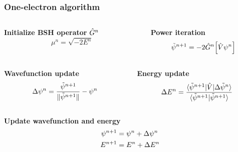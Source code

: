 \begin{frame}
  \frametitle{One-electron algorithm}
  \begin{columns}
    \begin{column}{.50\textwidth}
      \centering
      \textbf{Initialize BSH operator} $\hat{G}^n$
      \begin{equation}
        \nonumber
        \mu^n = \sqrt{-2E^n}
      \end{equation}
    \end{column}

    \begin{column}{.50\textwidth}
      \centering
      \textbf{Power iteration}
      \begin{equation}
        \nonumber
        \tilde{\psi}^{n+1} = -2\hat{G}^n \Big[\hat{V} \psi^n \Big]
      \end{equation}
    \end{column}
  \end{columns}

  \vspace{5mm}

  \begin{columns}
    \begin{column}{.50\textwidth}
      \centering
      \textbf{Wavefunction update}
      \begin{equation}
        \nonumber
        \Delta\psi^n =
        \frac{\tilde{\psi}^{n+1}}{\|\tilde{\psi}^{n+1}\|} - \psi^n
      \end{equation}
    \end{column}

    \begin{column}{.50\textwidth}
      \centering
      \textbf{Energy update}
      \begin{equation}
        \nonumber
        \Delta E^n =
        \frac{\langle\tilde{\psi}^{n+1}|\hat{V}|\Delta\tilde{\psi}^n\rangle}
        {\langle\tilde{\psi}^{n+1}|\tilde{\psi}^{n+1}\rangle}
      \end{equation}
    \end{column}
  \end{columns}

  \vspace{10mm}

  \centering
  \textbf{Update wavefunction and energy}
  \begin{align}
    \nonumber
    \psi^{n+1} &= \psi^n + \Delta \psi^n\\
    \nonumber
    E^{n+1} &= E^n + \Delta E^n
  \end{align}
\end{frame}

